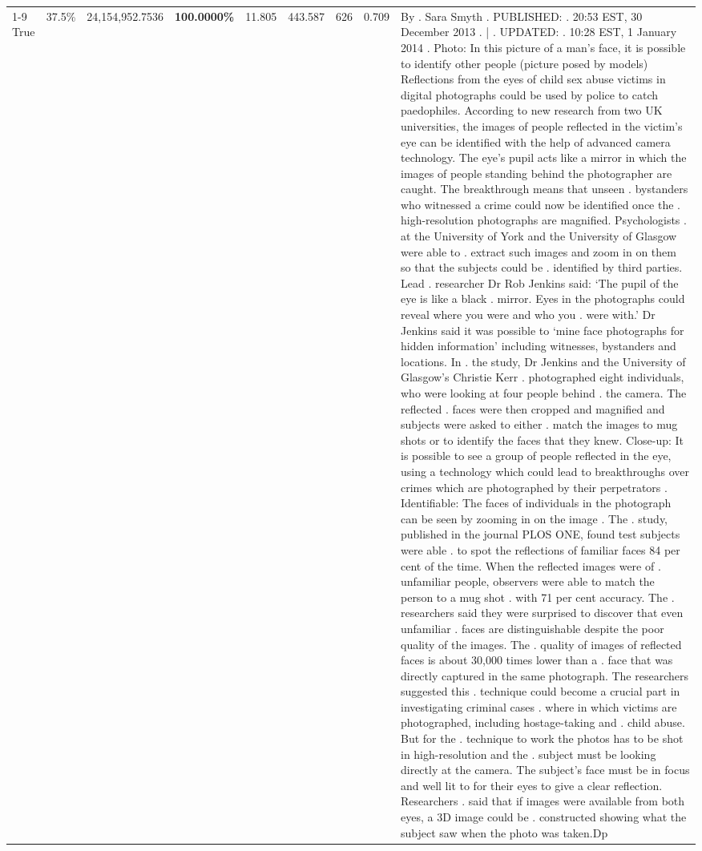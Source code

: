 \begin{table}[H]
\begin{tabular}{lllrlllll}
\cline{1-9}
True & 37.5\% & 24,154,952.7536 & \bfseries \color{red} 100.0000\% & 11.805 & 443.587 & 626 & 0.709 & By . Sara Smyth . PUBLISHED: . 20:53 EST, 30 December 2013 . | . UPDATED: . 10:28 EST, 1 January 2014 . Photo: In this picture of a man's face, it is possible to identify other people (picture posed by models) Reflections from the eyes of child sex abuse victims in digital photographs could be used by police to catch paedophiles. According to new research from two UK universities, the images of people reflected in the victim's eye can be identified with the help of advanced camera technology. The eye's pupil acts like a mirror in which the images of people standing behind the photographer are caught. The breakthrough means that unseen . bystanders who witnessed a crime could now be identified once the . high-resolution photographs are magnified. Psychologists . at the University of York and the University of Glasgow were able to . extract such images and zoom in on them so that the subjects could be . identified by third parties. Lead . researcher Dr Rob Jenkins said: ‘The pupil of the eye is like a black . mirror. Eyes in the photographs could reveal where you were and who you . were with.' Dr Jenkins said it was possible to ‘mine face photographs for hidden information' including witnesses, bystanders and locations. In . the study, Dr Jenkins and the University of Glasgow's Christie Kerr . photographed eight individuals, who were looking at four people behind . the camera. The reflected . faces were then cropped and magnified and subjects were asked to either . match the images to mug shots or to identify the faces that they knew. Close-up: It is possible to see a group of people reflected in the eye, using a technology which could lead to breakthroughs over crimes which are photographed by their perpetrators . Identifiable: The faces of individuals in the photograph can be seen by zooming in on the image . The . study, published in the journal PLOS ONE, found test subjects were able . to spot the reflections of familiar faces 84 per cent of the time. When the reflected images were of . unfamiliar people, observers were able to match the person to a mug shot . with 71 per cent accuracy. The . researchers said they were surprised to discover that even unfamiliar . faces are distinguishable despite the poor quality of the images. The . quality of images of reflected faces is about 30,000 times lower than a . face that was directly captured in the same photograph. The researchers suggested this . technique could become a crucial part in investigating criminal cases . where in which victims are photographed, including hostage-taking and . child abuse. But for the . technique to work the photos has to be shot in high-resolution and the . subject must be looking directly at the camera. The subject's face must be in focus and well lit to for their eyes to give a clear reflection. Researchers . said that if images were available from both eyes, a 3D image could be . constructed showing what the subject saw when the photo was taken.Dp \\

\end{tabular}
\end{table}
